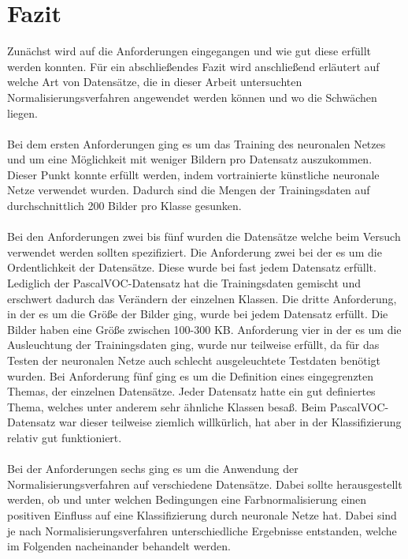 \chapter{Fazit}\label{s.fazit}
Zunächst wird auf die Anforderungen eingegangen und wie gut diese erfüllt werden konnten. Für ein abschließendes Fazit wird anschließend erläutert auf welche Art von Datensätze, die in dieser Arbeit untersuchten Normalisierungsverfahren angewendet werden können und wo die Schwächen liegen.\\\\
Bei dem ersten Anforderungen ging es um das Training des neuronalen Netzes und um eine Möglichkeit mit weniger Bildern pro Datensatz auszukommen. Dieser Punkt konnte erfüllt werden, indem vortrainierte künstliche neuronale Netze verwendet wurden. Dadurch sind die Mengen der Trainingsdaten auf durchschnittlich 200 Bilder pro Klasse gesunken.\\\\
Bei den Anforderungen zwei bis fünf wurden die Datensätze welche beim Versuch verwendet werden sollten spezifiziert. Die Anforderung zwei bei der es um die Ordentlichkeit der Datensätze. Diese wurde bei fast jedem Datensatz erfüllt. Lediglich der PascalVOC-Datensatz hat die Trainingsdaten gemischt und erschwert dadurch das Verändern der einzelnen Klassen. Die dritte Anforderung, in der es um die Größe der Bilder ging, wurde bei jedem Datensatz erfüllt. Die Bilder haben eine Größe zwischen 100-300 KB. Anforderung vier in der es um die Ausleuchtung der Trainingsdaten ging, wurde nur teilweise erfüllt, da für das Testen der neuronalen Netze auch schlecht ausgeleuchtete Testdaten benötigt wurden. Bei Anforderung fünf ging es um die Definition eines eingegrenzten Themas, der einzelnen Datensätze. Jeder Datensatz hatte ein gut definiertes Thema, welches unter anderem sehr ähnliche Klassen besaß. Beim PascalVOC-Datensatz war dieser teilweise ziemlich willkürlich, hat aber in der Klassifizierung relativ gut funktioniert.\\\\
Bei der Anforderungen sechs ging es um die Anwendung der Normalisierungsverfahren auf verschiedene Datensätze. Dabei sollte herausgestellt werden, ob und unter welchen Bedingungen eine Farbnormalisierung einen positiven Einfluss auf eine Klassifizierung durch neuronale Netze hat. Dabei sind je nach Normalisierungsverfahren unterschiedliche Ergebnisse entstanden, welche im Folgenden nacheinander behandelt werden.\\\\
